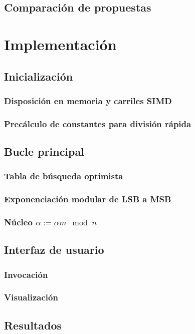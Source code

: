 \documentclass[conference, 14pt]{IEEEtran}
\begin{document}
\subsection{Comparación de propuestas}

\section{Implementación}

\subsection{Inicialización}

\subsubsection{Disposición en memoria y carriles SIMD}

\subsubsection{Precálculo de constantes para división rápida}

\subsection{Bucle principal}

\subsubsection{Tabla de búsqueda optimista}

\subsubsection{Exponenciación modular de LSB a MSB}

\subsubsection{Núcleo $\alpha := \alpha m \mod n$}

\subsection{Interfaz de usuario}

\subsubsection{Invocación}

\subsubsection{Visualización}

\subsection{Resultados}

\printbibliography[title={Referencias}]
\end{document}
